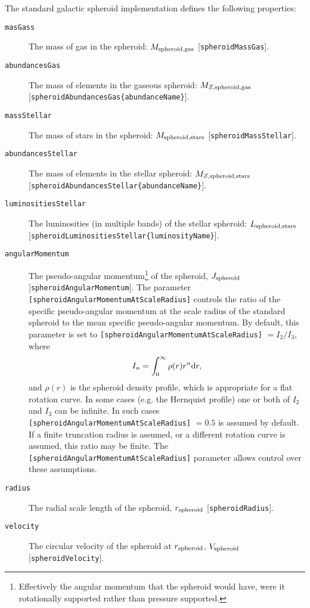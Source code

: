 The standard galactic spheroid implementation defines the following properties:
\begin{description}
 \item [{\tt masGass}] The mass of gas in the spheroid: $M_{\rm spheroid, gas}$ [{\tt spheroidMassGas}].
 \item [{\tt abundancesGas}] The mass of elements in the gaseous spheroid: $M_{Z, {\rm spheroid, gas}}$ [{\tt spheroidAbundancesGas\{abundanceName\}}].
 \item [{\tt massStellar}] The mass of stars in the spheroid: $M_{\rm spheroid, stars}$ [{\tt spheroidMassStellar}].
 \item [{\tt abundancesStellar}] The mass of elements in the stellar spheroid: $M_{Z, {\rm spheroid, stars}}$ [{\tt spheroidAbundancesStellar\{abundanceName\}}].
 \item [{\tt luminositiesStellar}] The luminosities (in multiple bands) of the stellar spheroid: $L_{\rm spheroid, stars}$ [{\tt spheroidLuminositiesStellar\{luminosityName\}}].
 \item [{\tt angularMomentum}] The pseudo-angular momentum\footnote{Effectively the angular momentum that the spheroid would have, were it rotationally supported rather than pressure supported.} of the spheroid, $J_{\rm spheroid}$ [{\tt spheroidAngularMomentum}]. The parameter {\tt [spheroidAngularMomentumAtScaleRadius]} controls the ratio of the specific pseudo-angular momentum at the scale radius of the standard spheroid to the mean specific pseudo-angular momentum. By default, this parameter is set to {\tt [spheroidAngularMomentumAtScaleRadius]} $= I_2/I_3$, where
\begin{equation}
I_n = \int_0^\infty \rho(r) r^n {\rm d}r,
\end{equation}
and $\rho(r)$ is the spheroid density profile, which is appropriate for a flat rotation curve. In some cases (e.g. the Hernquist profile) one or both of $I_2$ and $I_3$ can be infinite. In such cases {\tt [spheroidAngularMomentumAtScaleRadius]} $=0.5$ is assumed by default. If a finite truncation radius is assumed, or a different rotation curve is assumed, this ratio may be finite. The {\tt [spheroidAngularMomentumAtScaleRadius]} parameter allows control over these assumptions.
 \item [{\tt radius}] The radial scale length of the spheroid, $r_{\rm spheroid}$ [{\tt spheroidRadius}].
 \item [{\tt velocity}] The circular velocity of the spheroid at $r_{\rm spheroid}$, $V_{\rm spheroid}$ [{\tt spheroidVelocity}].
\end{description}
